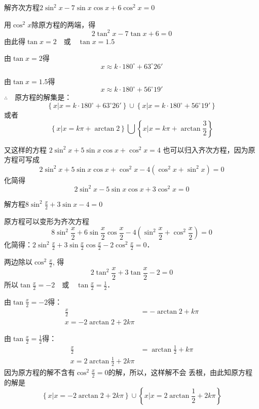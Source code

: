 \begin{example}
    解齐次方程$2\sin^2x-7\sin x\cos x+6\cos^2x=0$
\end{example}

\begin{solution}
用$\cos^2x$除原方程的两端，得
\[2\tan^2 x-7\tan x+6=0\]
由此得$\tan x=2\quad \text{或}\quad \tan x=1.5$

由$\tan x=2$得
\[x\approx k\cdot 180^{\circ}+63^{\circ}26'\]

由$\tan x=1.5$得
\[x\approx k\cdot 180^{\circ}+56^{\circ}19'\]
$\therefore\quad $原方程的解集是：
\[\left\{x\big|x=k\cdot 180^{\circ}+63^{\circ}26' \right\}\cup \left\{x\big|x=k\cdot 180^{\circ}+56^{\circ}19' \right\}\]
或者
\[\left\{x\big|x=k\pi+\arctan 2 \right\}\bigcup\left\{x\big|x=k\pi+\arctan\frac{3}{2} \right\}\]

又这样的方程
$2\sin^2x+5\sin x\cos x+\cos^2x=4$
也可以归入齐次方程，因为原方程可写成
\[2\sin^2x+5\sin x\cos x+\cos^2x-4(\cos^2x+\sin^2x)=0\]
化简得
\[2\sin^2x-5\sin x\cos x+3\cos^2x=0\]
\end{solution}

\begin{example}
    解方程$8\sin^2\frac{x}{2}+3\sin x-4=0$
\end{example}

\begin{solution}
    原方程可以变形为齐次方程
\[8\sin^2\frac{x}{2}+6\sin \frac{x}{2}\cos\frac{x}{2}-4\left(\sin^2\frac{x}{2}+\cos^2\frac{x}{2}\right)=0\]
化简得：$2\sin^2\frac{x}{2}+3\sin\frac{x}{2}\cos\frac{x}{2}-2\cos^2\frac{x}{2}=0$．

两边除以$\cos^2\frac{x}{2}$, 得
    \[2\tan^2\frac{x}{2}+3\tan\frac{x}{2}-2=0\]
所以$\tan\frac{x}{2}=-2\quad \text{或}\quad \tan\frac{x}{2}=\frac{1}{2}$．

由$\tan\frac{x}{2}=-2$得：
\[\begin{split}
    \frac{x}{2}&=-\arctan 2+k\pi\\
    x=-2\arctan 2+2k\pi
\end{split}\]

由$\tan\frac{x}{2}=\frac{1}{2}$得：
\[\begin{split}
    \frac{x}{2}&=\arctan \frac{1}{2}+k\pi\\
    x=2\arctan \frac{1}{2}+2k\pi
\end{split}\]
因为原方程的解不含有$\cos^2\frac{x}{2}=0$的解，所以，这样解不会
丢根，由此知原方程的解是
\[\left\{x\big|x=-2\arctan 2+2k\pi \right\}\cup \left\{x\big|x=2\arctan \frac{1}{2}+2k\pi \right\}\]
\end{solution}


